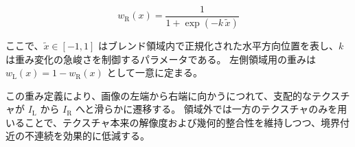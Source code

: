\begin{equation}
  w_{\mathrm{R}}(x) = \frac{1}{1 + \exp\!\left(-k\,\tilde{x}\right)}
  \label{eq:sigmoid_weight}
\end{equation}

ここで、$\tilde{x} \in [-1,1]$ はブレンド領域内で正規化された水平方向位置を表し、$k$ は重み変化の急峻さを制御するパラメータである。
左側領域用の重みは $w_{\mathrm{L}}(x) = 1 - w_{\mathrm{R}}(x)$ として一意に定まる。

この重み定義により、画像の左端から右端に向かうにつれて、支配的なテクスチャが $I_{\mathrm{L}}$ から $I_{\mathrm{R}}$ へと滑らかに遷移する。
領域外では一方のテクスチャのみを用いることで、テクスチャ本来の解像度および幾何的整合性を維持しつつ、境界付近の不連続を効果的に低減する。

